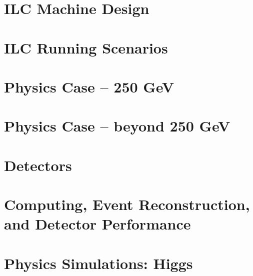 \documentclass[%
reprint,
nofootinbib,
 amsmath,amssymb,
 aps,
]{revtex4-1}
\begin{document}
   
   

   
\section{\label{sec:ilc}ILC Machine Design}

  
  

  
\section{\label{sec:runscenarios}ILC Running Scenarios  }
  
   

   
   
\section{\label{sec:physics}Physics Case -- 250 GeV }


 


\section{\label{sec:highenergy}Physics Case -- beyond 250 GeV }


 


 
\section{\label{sec:detectors}Detectors }


\section{\label{sec:software} Computing, Event Reconstruction, and
  Detector Performance}

  
   
   

\section{\label{sec:higgs}Physics Simulations: Higgs
}


 
  
 
\end{document}
